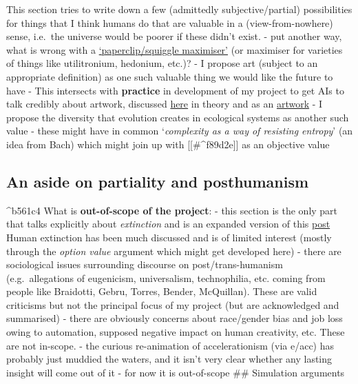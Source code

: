 \documentclass[
]{article}
\begin{document}
This section tries to write down a few (admittedly subjective/partial)
possibilities for things that I think humans do that are valuable in a
(view-from-nowhere) sense, i.e.~the universe would be poorer if these
didn't exist. - put another way, what is wrong with a
\href{https://www.lesswrong.com/tag/squiggle-maximizer-formerly-paperclip-maximizer}{`paperclip/squiggle
maximiser'} (or maximiser for varieties of things like utilitronium,
hedonium, etc.)? - I propose art (subject to an appropriate definition)
as one such valuable thing we would like the future to have - This
intersects with \textbf{practice} in development of my project to get
AIs to talk credibly about artwork, discussed
\href{https://tripleampersand.org/work-art-age-cybernetic-criticism/}{here}
in theory and as an \href{http://ukc10014.org/fixedp.html}{artwork} - I
propose the diversity that evolution creates in ecological systems as
another such value - these might have in common `\emph{complexity as a
way of resisting entropy}' (an idea from Bach) which might join up with
{[}{[}\#\^{}f89d2e{]}{]} as an objective value

\subsection{An aside on partiality and
posthumanism}\label{an-aside-on-partiality-and-posthumanism}

\^{}b561c4 What is \textbf{out-of-scope of the project}: - this section
is the only part that talks explicitly about \emph{extinction} and is an
expanded version of this
\href{https://www.lesswrong.com/posts/HaGTQcxqjHPyR9Ju6/unpicking-extinction}{post}
Human extinction has been much discussed and is of limited interest
(mostly through the \emph{option value} argument which might get
developed here) - there are sociological issues surrounding discourse on
post/trans-humanism (e.g.~allegations of eugenicism, universalism,
technophilia, etc. coming from people like Braidotti, Gebru, Torres,
Bender, McQuillan). These are valid criticisms but not the principal
focus of my project (but are acknowledged and summarised) - there are
obviously concerns about race/gender bias and job loss owing to
automation, supposed negative impact on human creativity, etc. These are
not in-scope. - the curious re-animation of accelerationism (via e/acc)
has probably just muddied the waters, and it isn't very clear whether
any lasting insight will come out of it - for now it is out-of-scope
\#\# Simulation arguments
\end{document}
